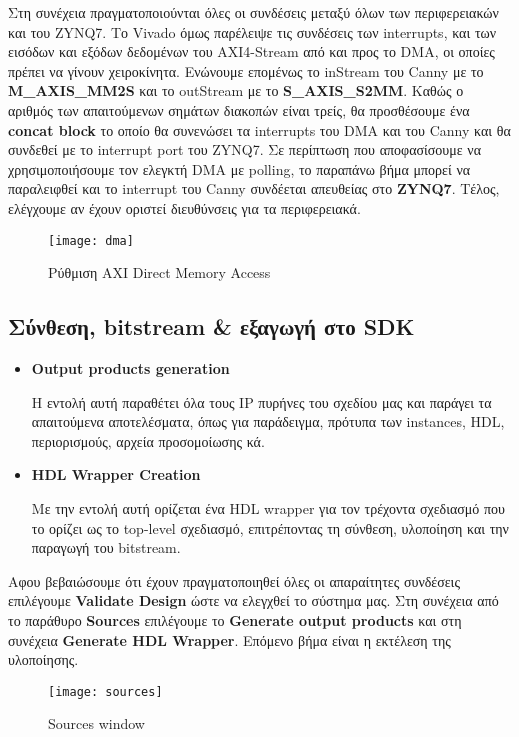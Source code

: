 Στη συνέχεια πραγματοποιούνται όλες οι συνδέσεις μεταξύ όλων των περιφερειακών και του ZYNQ7. Το Vivado όμως παρέλειψε τις συνδέσεις των interrupts, και των εισόδων και εξόδων δεδομένων του AXI4-Stream από και προς το DMA, οι οποίες πρέπει να γίνουν χειροκίνητα. Ενώνουμε επομένως το inStream του Canny με το \textbf{M\_AXIS\_MM2S} και το outStream με το \textbf{S\_AXIS\_S2MM}. Καθώς ο αριθμός των απαιτούμενων σημάτων διακοπών είναι τρείς, θα προσθέσουμε ένα \textbf{concat block} το οποίο θα συνενώσει τα interrupts του DMA και του Canny και θα συνδεθεί με το interrupt port του ZYNQ7. Σε περίπτωση που αποφασίσουμε να χρησιμοποιήσουμε τον ελεγκτή DMA με polling, το παραπάνω βήμα μπορεί να παραλειφθεί και το interrupt του Canny συνδέεται απευθείας στο \textbf{ZYNQ7}. Τέλος, ελέγχουμε αν έχουν οριστεί διευθύνσεις για τα περιφερειακά.
\begin{figure}[H]
   \centering
   \texttt{[image: dma]}\\
   \caption{Ρύθμιση AXI Direct Memory Access}
\end{figure}
\subsection{Σύνθεση, bitstream \& εξαγωγή στο SDK}

\begin{itemize}[label={},leftmargin=*]
\item \textbf{Output products generation}

Η εντολή αυτή παραθέτει όλα τους IP πυρήνες του σχεδίου μας και παράγει τα απαιτούμενα αποτελέσματα, όπως για παράδειγμα, πρότυπα των instances, HDL, περιορισμούς, αρχεία προσομοίωσης κά. \\
\item \textbf{HDL Wrapper Creation}

Με την εντολή αυτή ορίζεται ένα HDL wrapper για τον τρέχοντα σχεδιασμό που το ορίζει ως το top-level σχεδιασμό, επιτρέποντας τη σύνθεση, υλοποίηση και την παραγωγή του bitstream. \\
\end{itemize}

Αφου βεβαιώσουμε ότι έχουν πραγματοποιηθεί όλες οι απαραίτητες συνδέσεις επιλέγουμε \textbf{Validate Design} ώστε να ελεγχθεί το σύστημα μας. Στη συνέχεια από το παράθυρο \textbf{Sources} επιλέγουμε το \textbf{Generate output products} και στη συνέχεια \textbf{Generate HDL Wrapper}. Επόμενο βήμα είναι η εκτέλεση της υλοποίησης.
\begin{figure}[H]
   \centering
\texttt{[image: sources]}
   \caption{Sources window}
\end{figure}

